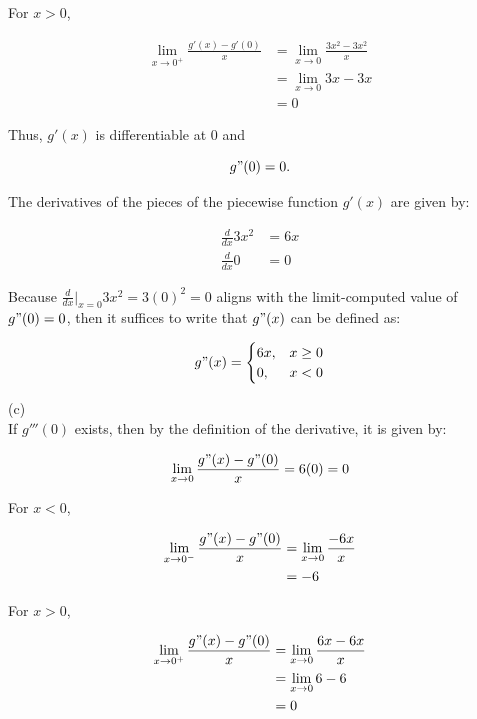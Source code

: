\documentclass{article}
\begin{document}
    For $x>0$,

    \begin{align*}
        \lim_{x\to 0^+} \frac{g'(x) - g'(0)}{x}     &= \lim_{x\to 0} \frac{3x^2 - 3x^2}{x} \\
                                                    &= \lim_{x\to 0} 3x - 3x \\
                                                    &= 0
    \end{align*}

    Thus, $g'(x)$ is differentiable at 0 and

    \[
        g"(0) = 0.
    \]

    The derivatives of the pieces of the piecewise function $g'(x)$ are given by:

    \begin{align*}
        \frac{d}{dx} 3x^2 &= 6x \\
        \frac{d}{dx} 0    &= 0
    \end{align*}

    Because $\frac{d}{dx}\Big|_{x=0} 3x^2 = 3(0)^2 = 0$ aligns with the limit-computed value of $g"(0)=0$, then it suffices to write that $g"(x)$ can be defined as:

    \[
        g"(x) =
        \begin{cases}
            6x, & x \geq 0 \\
            0,  & x < 0
        \end{cases}
    \]

    (c) \\

    If $g'''(0)$ exists, then by the definition of the derivative, it is given by:

    \[
       \lim_{x\to 0} \frac{g"(x) - g"(0)}{x} = 6(0) = 0
    \]

    For $x < 0$,

    \begin{align*}
        \lim_{x\to 0^-} \frac{g"(x) - g"(0)}{x} &= \lim_{x\to 0} \frac{-6x}{x} \\
                                                &= -6
    \end{align*}

    For $x>0$,

    \begin{align*}
        \lim_{x\to 0^+} \frac{g"(x) - g"(0)}{x} &= \lim_{x\to 0} \frac{6x-6x}{x} \\
                                                &= \lim_{x\to 0} 6 - 6 \\
                                                &= 0
    \end{align*}
\end{document}
